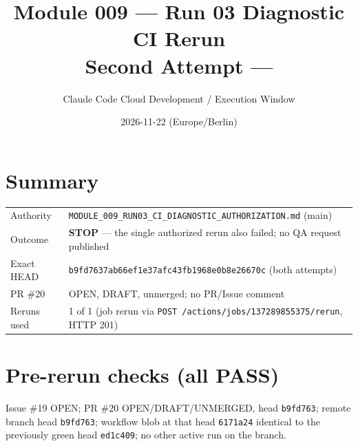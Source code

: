\documentclass[11pt,a4paper]{article}
\title{Module 009 --- Run 03 Diagnostic CI Rerun\\Second Attempt \FAIL{} --- \STOP}
\author{Claude Code Cloud Development / Execution Window}
\date{2026-11-22 (Europe/Berlin)}
\newcommand{\sha}[1]{\texttt{\small #1}}
\newcommand{\PASS}{\textcolor{green!50!black}{\textbf{PASS}}}
\newcommand{\STOP}{\textcolor{red!70!black}{\textbf{STOP}}}
\begin{document}
\maketitle
\section*{Summary}
\begin{tabularx}{\textwidth}{@{}lX@{}}
\toprule
Authority & \texttt{MODULE\_009\_RUN03\_CI\_DIAGNOSTIC\_AUTHORIZATION.md} (main) \\
Outcome & \STOP{} --- the single authorized rerun also failed; no QA request published \\
Exact HEAD & \sha{b9fd7637ab66ef1e37afc43fb1968e0b8e26670c} (both attempts) \\
PR \#20 & OPEN, DRAFT, unmerged; no PR/Issue comment \\
Reruns used & 1 of 1 (job rerun via \texttt{POST /actions/jobs/137289855375/rerun}, HTTP 201) \\
\bottomrule
\end{tabularx}

\section{Pre-rerun checks (all \PASS)}
Issue \#19 OPEN; PR \#20 OPEN/DRAFT/UNMERGED, head \sha{b9fd763}; remote branch head \sha{b9fd763}; workflow blob at that head \sha{6171a24} identical to the previously green head \sha{ed1c409}; no other active run on the branch.
\end{document}
